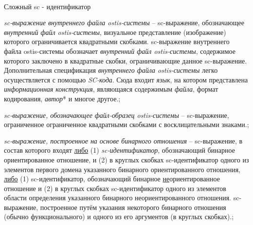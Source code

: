 \begin{frame}{\\Сложный sc - идентификатор}
	\topline
	\justifying
	\vspace*{\fill}\\
	\scriptsize{
		\begin{textitemize}
			\item{\textit{sc-выражение внутреннего файла ostis-системы} -- sc-выражение, обозначающее \textit{внутренний файл ostis-системы}, визуальное представление (изображение) которого ограничивается квадратными скобками. sc-выражение внутреннего файла ostis-системы обозначает \textit{внутренний файл ostis-системы}, содержимое которого заключено в квадратные скобки, ограничивающие данное sc-выражение.
				Дополнительная спецификация \textit{внутреннего файла ostis-системы} легко осуществляется с помощью \textit{SC-кода}. Сюда входит \textit{язык}, на котором представлена \textit{информационная конструкция}, являющаяся содержимым \textit{файла}, формат кодирования, \textit{автор}* и многое другое.};
			\item{\textit{sc-выражение, обозначающее файл-образец ostis-системы} -- sc-выражение, ограниченное ограниченное квадратными скобками с восклицательными знаками.};
			\item{\textit{sc-выражение, построенное на основе бинарного отношения} -- sc-выражение, в состав которого входят \underline{либо} (1) \textit{sc-идентификатор}, обозначающий бинарное ориентированное отношение, и (2) в круглых скобках sc-идентификатор одного из элементов первого домена указанного бинарного ориентированного отношения, \underline{либо} (1) sc-идентификатор, обозначающий бинарное \underline{не}ориентированное отношение и (2) в круглых скобках sc-идентификатор одного из элементов области определения указанного бинарного неориентированного отношения. sc-выражение, построенное путём указания некоторого бинарного отношения (обычно функционального) и одного из его аргументов (в круглых скобках).};
		\end{textitemize}	
	}
\end{frame}
